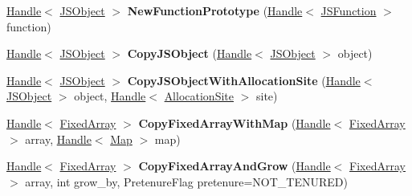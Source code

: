 \begin{DoxyCompactItemize}
\item 
\hyperlink{classv8_1_1internal_1_1_handle}{Handle}$<$ \hyperlink{classv8_1_1internal_1_1_j_s_object}{J\+S\+Object} $>$ {\bfseries New\+Function\+Prototype} (\hyperlink{classv8_1_1internal_1_1_handle}{Handle}$<$ \hyperlink{classv8_1_1internal_1_1_j_s_function}{J\+S\+Function} $>$ function)\hypertarget{classv8_1_1internal_1_1_factory_a48782380c9d9ae51f8b50520b5717240}{}\label{classv8_1_1internal_1_1_factory_a48782380c9d9ae51f8b50520b5717240}

\item 
\hyperlink{classv8_1_1internal_1_1_handle}{Handle}$<$ \hyperlink{classv8_1_1internal_1_1_j_s_object}{J\+S\+Object} $>$ {\bfseries Copy\+J\+S\+Object} (\hyperlink{classv8_1_1internal_1_1_handle}{Handle}$<$ \hyperlink{classv8_1_1internal_1_1_j_s_object}{J\+S\+Object} $>$ object)\hypertarget{classv8_1_1internal_1_1_factory_a3c0049b99b784210fe7f691da47e9af0}{}\label{classv8_1_1internal_1_1_factory_a3c0049b99b784210fe7f691da47e9af0}

\item 
\hyperlink{classv8_1_1internal_1_1_handle}{Handle}$<$ \hyperlink{classv8_1_1internal_1_1_j_s_object}{J\+S\+Object} $>$ {\bfseries Copy\+J\+S\+Object\+With\+Allocation\+Site} (\hyperlink{classv8_1_1internal_1_1_handle}{Handle}$<$ \hyperlink{classv8_1_1internal_1_1_j_s_object}{J\+S\+Object} $>$ object, \hyperlink{classv8_1_1internal_1_1_handle}{Handle}$<$ \hyperlink{classv8_1_1internal_1_1_allocation_site}{Allocation\+Site} $>$ site)\hypertarget{classv8_1_1internal_1_1_factory_a411ce25e26a30e3e3641bb0f6e48b6b4}{}\label{classv8_1_1internal_1_1_factory_a411ce25e26a30e3e3641bb0f6e48b6b4}

\item 
\hyperlink{classv8_1_1internal_1_1_handle}{Handle}$<$ \hyperlink{classv8_1_1internal_1_1_fixed_array}{Fixed\+Array} $>$ {\bfseries Copy\+Fixed\+Array\+With\+Map} (\hyperlink{classv8_1_1internal_1_1_handle}{Handle}$<$ \hyperlink{classv8_1_1internal_1_1_fixed_array}{Fixed\+Array} $>$ array, \hyperlink{classv8_1_1internal_1_1_handle}{Handle}$<$ \hyperlink{classv8_1_1internal_1_1_map}{Map} $>$ map)\hypertarget{classv8_1_1internal_1_1_factory_ad5d1dcf17fdd7dbaa391b60f184545e1}{}\label{classv8_1_1internal_1_1_factory_ad5d1dcf17fdd7dbaa391b60f184545e1}

\item 
\hyperlink{classv8_1_1internal_1_1_handle}{Handle}$<$ \hyperlink{classv8_1_1internal_1_1_fixed_array}{Fixed\+Array} $>$ {\bfseries Copy\+Fixed\+Array\+And\+Grow} (\hyperlink{classv8_1_1internal_1_1_handle}{Handle}$<$ \hyperlink{classv8_1_1internal_1_1_fixed_array}{Fixed\+Array} $>$ array, int grow\+\_\+by, Pretenure\+Flag pretenure=N\+O\+T\+\_\+\+T\+E\+N\+U\+R\+ED)\hypertarget{classv8_1_1internal_1_1_factory_a1a06a21a533e14d88ffc89f429a70ca5}{}\label{classv8_1_1internal_1_1_factory_a1a06a21a533e14d88ffc89f429a70ca5}


\end{DoxyCompactItemize}

